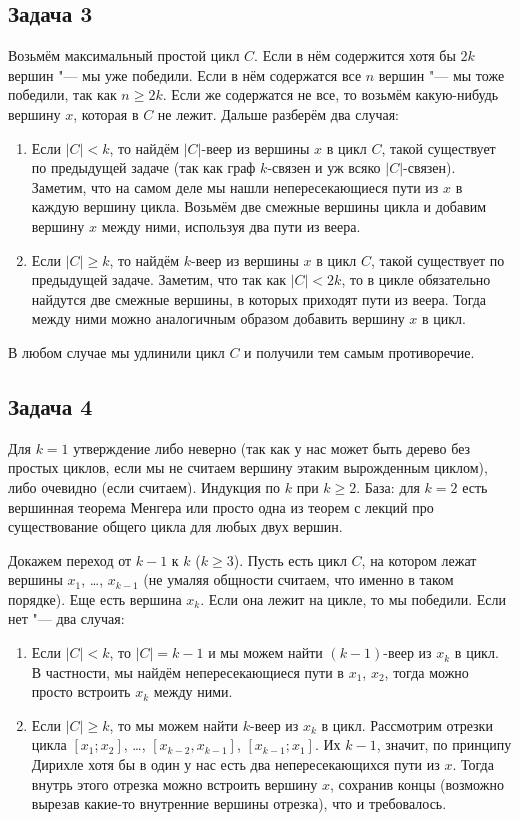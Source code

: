 \subsection{Задача 3}
	Возьмём максимальный простой цикл $C$.
	Если в нём содержится хотя бы $2k$ вершин "--- мы уже победили.
	Если в нём содержатся все $n$ вершин "--- мы тоже победили, так как $n\ge2k$.
	Если же содержатся не все, то возьмём какую-нибудь вершину $x$, которая в $C$ не лежит.
	Дальше разберём два случая:
	\begin{enumerate}
		\item
			Если $|C|< k$, то найдём $|C|$-веер из вершины $x$ в цикл $C$,
			такой существует по предыдущей задаче (так как граф $k$-связен и уж
			всяко $|C|$-связен).
			Заметим, что на самом деле мы нашли непересекающиеся пути из $x$
			в каждую вершину цикла.
			Возьмём две смежные вершины цикла и добавим вершину $x$ между ними,
			используя два пути из веера.
		\item
			Если $|C|\ge k$, то найдём $k$-веер из вершины $x$ в цикл $C$,
			такой существует по предыдущей задаче.
			Заметим, что так как $|C|< 2k$, то в цикле обязательно найдутся
			две смежные вершины, в которых приходят пути из веера.
			Тогда между ними можно аналогичным образом добавить вершину $x$ в цикл.
	\end{enumerate}
	В любом случае мы удлинили цикл $C$ и получили тем самым противоречие.

\subsection{Задача 4}
	Для $k = 1$ утверждение либо неверно (так как у нас может быть дерево
	без простых циклов, если мы не считаем вершину этаким вырожденным циклом),
	либо очевидно (если считаем).
	Индукция по $k$ при $k\ge 2$.
	База: для $k=2$ есть вершинная теорема Менгера или просто одна из теорем с лекций
	про существование общего цикла для любых двух вершин.

	Докажем переход от $k-1$ к $k$ ($k \ge 3$).
	Пусть есть цикл $C$, на котором лежат вершины $x_1$, \dots, $x_{k-1}$ (не умаляя общности
	считаем, что именно в таком порядке).
	Еще есть вершина $x_k$.
	Если она лежит на цикле, то мы победили.
	Если нет "--- два случая:
	\begin{enumerate}
		\item
			Если $|C|<k$, то $|C|=k-1$ и мы можем найти $(k-1)$-веер из $x_k$ в цикл.
			В частности, мы найдём непересекающиеся пути в $x_1$, $x_2$,
			тогда можно просто встроить $x_k$ между ними.
		\item
			Если $|C|\ge k$, то мы можем найти $k$-веер из $x_k$ в цикл.
			Рассмотрим отрезки цикла $[x_1; x_2]$, \dots, $[x_{k-2}, x_{k-1}]$, $[x_{k-1}; x_1]$.
			Их $k-1$, значит, по принципу Дирихле хотя бы в один у нас есть два непересекающихся
			пути из $x$.
			Тогда внутрь этого отрезка можно встроить вершину $x$, сохранив концы
			(возможно вырезав какие-то внутренние вершины отрезка), что и требовалось.
	\end{enumerate}

